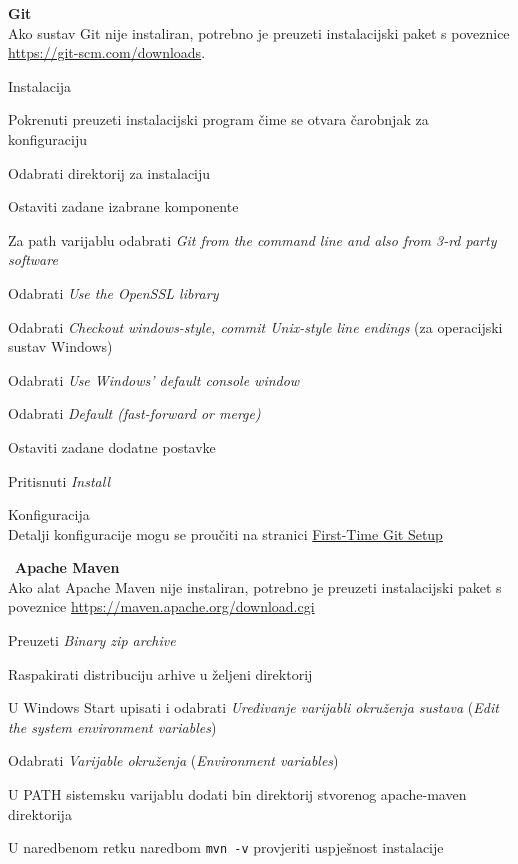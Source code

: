 		
			\textbf{Git}
			\\Ako sustav Git nije instaliran, potrebno je preuzeti instalacijski paket s poveznice \href{https://git-scm.com/downloads}{https://git-scm.com/downloads}.
			\begin{packed_item}
				\item Instalacija
				\begin{packed_enum}
					\item Pokrenuti preuzeti instalacijski program čime se otvara čarobnjak za konfiguraciju
					\item Odabrati direktorij za instalaciju
					\item Ostaviti zadane izabrane komponente
					\item Za path varijablu odabrati \textit{Git from the command line and also from 3-rd party software}
					\item Odabrati \textit{Use the OpenSSL library}
					\item Odabrati \textit{Checkout windows-style, commit Unix-style line endings } (za operacijski sustav Windows)
					\item Odabrati \textit{Use Windows' default console window}
					\item Odabrati \textit{Default (fast-forward or merge)}
					\item Ostaviti zadane dodatne postavke
					\item Pritisnuti \textit{Install}
				\end{packed_enum}
				\item Konfiguracija
				\\Detalji konfiguracije mogu se proučiti na stranici \href{https://git-scm.com/book/en/v2/Getting-Started-First-Time-Git-Setup}{First-Time Git Setup}
			\end{packed_item}
			\
			\textbf{Apache Maven}
			\\Ako alat Apache Maven nije instaliran, potrebno je preuzeti instalacijski paket s poveznice 	\href{https://maven.apache.org/download.cgi}{https://maven.apache.org/download.cgi}
				\begin{packed_enum}
					\item Preuzeti \textit{Binary zip archive}
					\item Raspakirati distribuciju arhive u željeni direktorij
					\item U Windows Start upisati i odabrati \textit{Uređivanje varijabli okruženja sustava} (\textit{Edit the system environment variables}) 
					\item Odabrati \textit{Varijable okruženja} (\textit{Environment variables})
					\item U PATH sistemsku varijablu dodati bin direktorij stvorenog apache-maven direktorija
					\item U naredbenom retku naredbom \texttt{mvn -v} provjeriti uspješnost instalacije
				\end{packed_enum}
